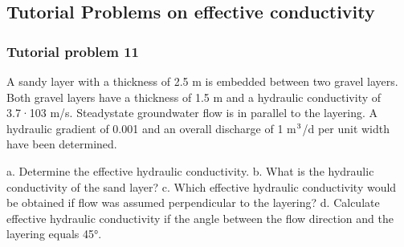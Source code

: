 \documentclass[letterpaper,10pt,english]{sphinxmanual}
\begin{document}
\subsection{Tutorial Problems on effective conductivity}
\label{\detokenize{contents/tutorials/tutorial_04/tutorial_04:tutorial-problems-on-effective-conductivity}}

\subsubsection{Tutorial problem 11}
\label{\detokenize{contents/tutorials/tutorial_04/tutorial_04:tutorial-problem-11}}
A sandy layer with a thickness of 2.5 m is embedded between two gravel layers. Both gravel layers have a thickness of 1.5 m and a hydraulic conductivity of 3.7·10\sphinxhyphen{}3 m/s.
Steady\sphinxhyphen{}state groundwater flow is in parallel to the layering.
A hydraulic gradient of 0.001 and an overall discharge of 1 m\(\sp{\text{3}}\)/d per unit width have been determined.

a. Determine the effective hydraulic conductivity.
b. What is the hydraulic conductivity of the sand layer?
c. Which effective hydraulic conductivity would be obtained if flow was assumed perpendicular to the layering?
d. Calculate effective hydraulic conductivity if the angle between the flow direction and the layering equals 45°.
\end{document}
